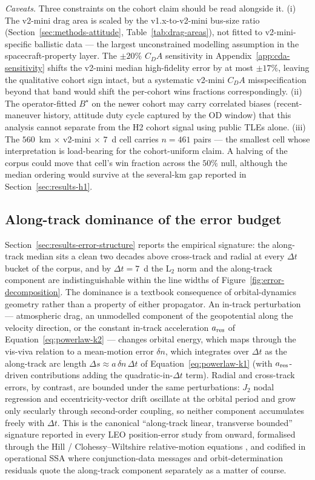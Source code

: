 \documentclass[10pt, letterpaper]{article}
\begin{document}
\emph{Caveats.} Three constraints on the cohort claim should be
read alongside it. (i) The v2-mini drag area is scaled by the
v1.x-to-v2-mini bus-size ratio (Section~\ref{sec:methods-attitude},
Table~\ref{tab:drag-areas}), not fitted to v2-mini-specific
ballistic data --- the largest unconstrained modelling
assumption in the spacecraft-property layer. The
$\pm 20\%$ $C_{D} A$ sensitivity in
Appendix~\ref{app:cda-sensitivity} shifts the v2-mini median
high-fidelity error by at most $\pm 17\%$, leaving the
qualitative cohort sign intact, but a systematic v2-mini
$C_{D} A$ misspecification beyond that band would shift the
per-cohort wins fractions correspondingly. (ii) The
operator-fitted $B^{\!\star}$ on the newer cohort may carry
correlated biases (recent-maneuver history, attitude duty cycle
captured by the OD window) that this analysis cannot
separate from the H2 cohort signal using public TLEs alone.
(iii) The $560$~km $\times$ v2-mini $\times$ $7$~d cell carries
$n = 461$ pairs --- the smallest cell whose interpretation is
load-bearing for the cohort-uniform claim. A halving of the
corpus could move that cell's win fraction across the $50\%$
null, although the median ordering would survive at the
several-km gap reported in Section~\ref{sec:results-h1}.

\subsection{Along-track dominance of the error budget}
\label{sec:discussion-along-track}

Section~\ref{sec:results-error-structure} reports the empirical
signature: the along-track median sits a clean two decades above
cross-track and radial at every $\Delta t$ bucket of the corpus,
and by $\Delta t = 7$~d the L$_{2}$ norm and the along-track
component are indistinguishable within the line widths of
Figure~\ref{fig:error-decomposition}. The dominance is a textbook
consequence of orbital-dynamics geometry rather than a property of
either propagator. An in-track perturbation --- atmospheric drag,
an unmodelled component of the geopotential along the velocity
direction, or the constant in-track acceleration $a_{\rm{res}}$ of
Equation~\eqref{eq:powerlaw-k2} --- changes orbital energy, which
maps through the vis-viva relation to a mean-motion error
$\delta n$, which integrates over $\Delta t$ as the along-track
arc length $\Delta s \approx a\,\delta n\,\Delta t$ of
Equation~\eqref{eq:powerlaw-k1} (with $a_{\rm{res}}$-driven
contributions adding the quadratic-in-$\Delta t$ term). Radial
and cross-track errors, by contrast, are bounded under the same
perturbations: $J_{2}$ nodal regression and eccentricity-vector
drift oscillate at the orbital period and grow only secularly
through second-order coupling, so neither component accumulates
freely with $\Delta t$. This is the canonical ``along-track
linear, transverse bounded'' signature reported in every LEO
position-error study from \citet{vallado2006} onward, formalised
through the Hill / Clohessy--Wiltshire relative-motion equations
\citep[\S\,3.4]{vallado2013}, and codified in operational SSA
where conjunction-data messages and orbit-determination
residuals quote the along-track component separately as a matter
of course.
\end{document}
